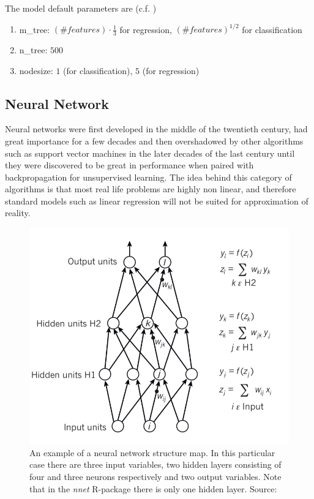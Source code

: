 \documentclass[a4paper,12pt]{article}
\begin{document}
The model default parameters are (c.f. \cite{breiman2001random})
\begin{enumerate}
\item m\_tree:  $(\#features) \cdot \frac{1}{3} $ for regression, $ (\#features)^{1/2}$ for classification
\item n\_tree:  $500$
\item nodesize: $1$ (for classification), $5$ (for regression)
\end{enumerate}

\subsection{Neural Network}

Neural networks were first developed in the middle of the twentieth century, had great importance for a few decades and then overshadowed by other algorithms such as support vector machines in the later decades of the last century until they were discovered to be great in performance when paired with backpropagation for unsupervised learning.
The idea behind this category of algorithms is that most real life problems are highly non linear, and therefore standard models such as linear regression will not be suited for approximation of reality.
\begin{figure}
  \begin{minipage}[c]{0.65\textwidth}
    \includegraphics[width=\textwidth]{pictures/nnet_1.png}
  \end{minipage}\hfill
  \begin{minipage}[c]{0.35\textwidth}
    \caption{An example of a neural network structure map. In this particular case there are three input variables, two hidden layers consisting of four and three neurons respectively and two output variables.
    Note that in the \textit{nnet} R-package there is only one hidden layer. Source: \cite{lecun2015}}
    \label{Figure::Nnet_1}
  \end{minipage}
\end{figure}
\end{document}
